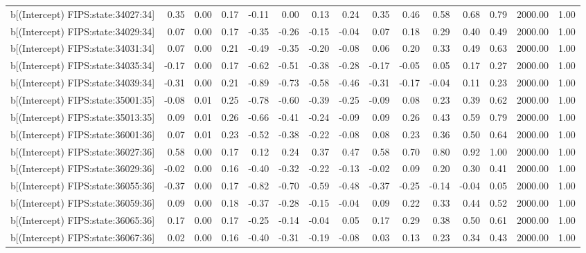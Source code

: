 \begin{table}[ht]
\begin{tabular}{rrrrrrrrrrrrrrr}
  b[(Intercept) FIPS:state:34027:34] & 0.35 & 0.00 & 0.17 & -0.11 & 0.00 & 0.13 & 0.24 & 0.35 & 0.46 & 0.58 & 0.68 & 0.79 & 2000.00 & 1.00 \\ 
  b[(Intercept) FIPS:state:34029:34] & 0.07 & 0.00 & 0.17 & -0.35 & -0.26 & -0.15 & -0.04 & 0.07 & 0.18 & 0.29 & 0.40 & 0.49 & 2000.00 & 1.00 \\ 
  b[(Intercept) FIPS:state:34031:34] & 0.07 & 0.00 & 0.21 & -0.49 & -0.35 & -0.20 & -0.08 & 0.06 & 0.20 & 0.33 & 0.49 & 0.63 & 2000.00 & 1.00 \\ 
  b[(Intercept) FIPS:state:34035:34] & -0.17 & 0.00 & 0.17 & -0.62 & -0.51 & -0.38 & -0.28 & -0.17 & -0.05 & 0.05 & 0.17 & 0.27 & 2000.00 & 1.00 \\ 
  b[(Intercept) FIPS:state:34039:34] & -0.31 & 0.00 & 0.21 & -0.89 & -0.73 & -0.58 & -0.46 & -0.31 & -0.17 & -0.04 & 0.11 & 0.23 & 2000.00 & 1.00 \\ 
  b[(Intercept) FIPS:state:35001:35] & -0.08 & 0.01 & 0.25 & -0.78 & -0.60 & -0.39 & -0.25 & -0.09 & 0.08 & 0.23 & 0.39 & 0.62 & 2000.00 & 1.00 \\ 
  b[(Intercept) FIPS:state:35013:35] & 0.09 & 0.01 & 0.26 & -0.66 & -0.41 & -0.24 & -0.09 & 0.09 & 0.26 & 0.43 & 0.59 & 0.79 & 2000.00 & 1.00 \\ 
  b[(Intercept) FIPS:state:36001:36] & 0.07 & 0.01 & 0.23 & -0.52 & -0.38 & -0.22 & -0.08 & 0.08 & 0.23 & 0.36 & 0.50 & 0.64 & 2000.00 & 1.00 \\ 
  b[(Intercept) FIPS:state:36027:36] & 0.58 & 0.00 & 0.17 & 0.12 & 0.24 & 0.37 & 0.47 & 0.58 & 0.70 & 0.80 & 0.92 & 1.00 & 2000.00 & 1.00 \\ 
  b[(Intercept) FIPS:state:36029:36] & -0.02 & 0.00 & 0.16 & -0.40 & -0.32 & -0.22 & -0.13 & -0.02 & 0.09 & 0.20 & 0.30 & 0.41 & 2000.00 & 1.00 \\ 
  b[(Intercept) FIPS:state:36055:36] & -0.37 & 0.00 & 0.17 & -0.82 & -0.70 & -0.59 & -0.48 & -0.37 & -0.25 & -0.14 & -0.04 & 0.05 & 2000.00 & 1.00 \\ 
  b[(Intercept) FIPS:state:36059:36] & 0.09 & 0.00 & 0.18 & -0.37 & -0.28 & -0.15 & -0.04 & 0.09 & 0.22 & 0.33 & 0.44 & 0.52 & 2000.00 & 1.00 \\ 
  b[(Intercept) FIPS:state:36065:36] & 0.17 & 0.00 & 0.17 & -0.25 & -0.14 & -0.04 & 0.05 & 0.17 & 0.29 & 0.38 & 0.50 & 0.61 & 2000.00 & 1.00 \\ 
  b[(Intercept) FIPS:state:36067:36] & 0.02 & 0.00 & 0.16 & -0.40 & -0.31 & -0.19 & -0.08 & 0.03 & 0.13 & 0.23 & 0.34 & 0.43 & 2000.00 & 1.00 \\ 

\end{tabular}
\end{table}
